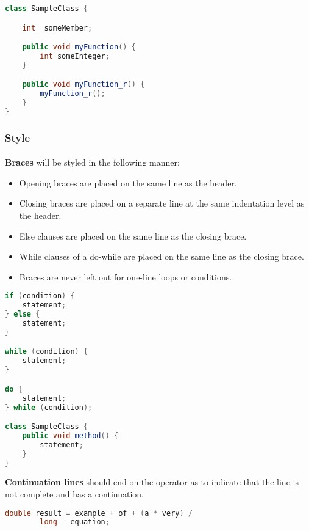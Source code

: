 \documentclass{article}
\begin{document}
    \begin{lstlisting}[language=java]
class SampleClass {

    int _someMember;

    public void myFunction() {
        int someInteger;
    }

    public void myFunction_r() {
        myFunction_r();
    }
}
    \end{lstlisting}

    \subsubsection{Style}
    \label{sec:ls-java-st}

    \paragraph{}
    \textbf{Braces} will be styled in the following manner:
    \begin{itemize}
        \item Opening braces are placed on the same line as the header.
        \item Closing braces are placed on a separate line at the same
                indentation level as the header.
        \item Else clauses are placed on the same line as the closing brace.
        \item While clauses of a do-while are placed on the same line as the
                closing brace.
        \item Braces are never left out for one-line loops or conditions.
    \end{itemize}

    \begin{lstlisting}[language=Java]
if (condition) {
    statement;
} else {
    statement;
}

while (condition) {
    statement;
}

do {
    statement;
} while (condition);

class SampleClass {
    public void method() {
        statement;
    }
}
    \end{lstlisting}

    \textbf{Continuation lines} should end on the operator as to indicate that
    the line is not complete and has a continuation.

    \begin{lstlisting}[language=Java]
double result = example + of + (a * very) / 
        long - equation;
    \end{lstlisting}
\end{document}

